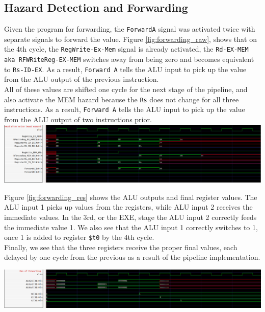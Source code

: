 \documentclass[twocolumn]{article}
\newcommand{\cc}[1]{\texttt{#1}}
\begin{document}
\subsection{Hazard Detection and Forwarding}

Given the program for forwarding, the \cc{ForwardA} signal was activated twice with separate signals to forward the value. Figure \ref{fig:forwarding_raw}, shows that on the 4th cycle, the \cc{RegWrite-Ex-Mem} signal is already activated, the \cc{Rd-EX-MEM aka RFWRiteReg-EX-MEM} switches away from being zero and becomes equivalent to \cc{Rs-ID-EX}. As a result, \cc{Forward A} tells the ALU input to pick up the value from the ALU output of the previous instruction.\\

All of these values are shifted one cycle for the next stage of the pipeline, and also activate the MEM hazard because the \cc{Rs} does not change for all three instructions. As a result, \cc{Forward A} tells the ALU input to pick up the value from the ALU output of two instructions prior.\\

\begingroup
    \centering
    \medskip
    \includegraphics[width=\columnwidth]{Lab-Tex/Lab7-images/p1.png}
    \label{fig:forwarding_raw}
    \medskip
\endgroup

Figure \ref{fig:forwarding_res} shows the ALU outputs and final register values. The ALU input 1 picks up values from the registers, while ALU input 2 receives the immediate values. In the 3rd, or the EXE, stage the ALU input 2 correctly feeds the immediate value 1. We also see that the ALU input 1 correctly switches to 1, once 1 is added to register \cc{\$t0} by the 4th cycle.\\

Finally, we see that the three registers receive the proper final values, each delayed by one cycle from the previous as a result of the pipeline implementation.

\begingroup
    \centering
    \medskip
    \includegraphics[width=\columnwidth]{Lab-Tex/Lab7-images/p2.png}
    \label{fig:forwarding_res}
    \medskip
\endgroup
\end{document}
